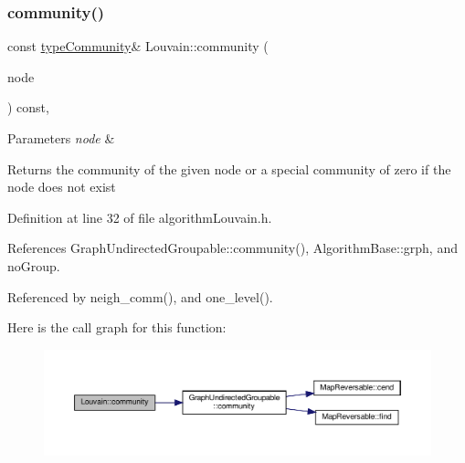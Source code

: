 \subsubsection{\texorpdfstring{community()}{community()}\hspace{0.1cm}{\footnotesize\ttfamily [1/2]}}
{\footnotesize\ttfamily const \hyperlink{graphUndirectedGroupable_8h_a914da95c9ea7f14f4b7f875c36818556}{type\+Community}\& Louvain\+::community (\begin{DoxyParamCaption}\item[{const \hyperlink{edge_8h_a5fbd20c46956d479cb10afc9855223f6}{type\+Vertex} \&}]{node }\end{DoxyParamCaption}) const\hspace{0.3cm}{\ttfamily [inline]}, {\ttfamily [private]}}


\begin{DoxyParams}{Parameters}
{\em node} & \\
\hline
\end{DoxyParams}
\begin{DoxyReturn}{Returns}
the community of the given node or a special community of zero if the node does not exist 
\end{DoxyReturn}


Definition at line 32 of file algorithm\+Louvain.\+h.



References Graph\+Undirected\+Groupable\+::community(), Algorithm\+Base\+::grph, and no\+Group.



Referenced by neigh\+\_\+comm(), and one\+\_\+level().

Here is the call graph for this function\+:
\nopagebreak
\begin{figure}[H]
\begin{center}
\leavevmode
\includegraphics[width=350pt]{classLouvain_ae2fa8ae9be32c0ef6b3ed28f68364972_cgraph}
\end{center}
\end{figure}
\mbox{\label{classLouvain_a0b978ea547fbbeb7bf6b023694c57233}} 
